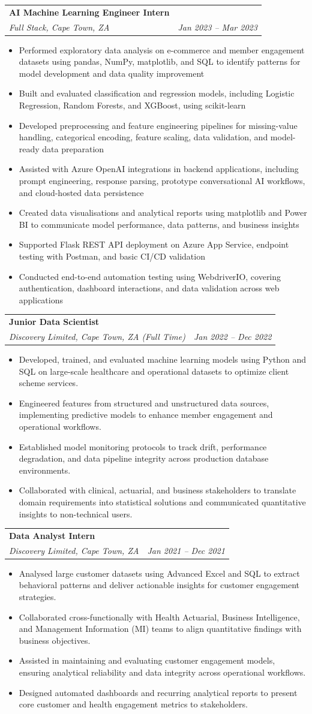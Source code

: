 \documentclass[letterpaper,11pt]{article}
\makeatletter
\newcommand{\resumeItem}[1]{
  \item\small{
    {#1 \vspace{-1pt}}
  }
}
\newcommand{\resumeSubheading}[4]{
  \vspace{-2pt}\item
    \begin{tabular*}{1.0\textwidth}[t]{l@{\extracolsep{\fill}}r}
      \textbf{\large#1} & \textbf{\small #2} \\
      \textit{\large#3} & \textit{\small #4} \\

    \end{tabular*}\vspace{-7pt}
}
\newcommand{\resumeItemListStart}{\begin{itemize}[leftmargin=0.1in]}
\newcommand{\resumeItemListEnd}{\end{itemize}\vspace{-5pt}}
\makeatother
\begin{document}
    \resumeSubheading
      {AI Machine Learning Engineer Intern}{}
      {Full Stack, Cape Town, ZA}{Jan 2023 -- Mar 2023}
      \resumeItemListStart
            \resumeItem{\normalsize{Performed exploratory data analysis on e-commerce and member engagement datasets using pandas, NumPy, matplotlib, and SQL to identify patterns for model development and data quality improvement}}
            \resumeItem{\normalsize{Built and evaluated classification and regression models, including Logistic Regression, Random Forests, and XGBoost, using scikit-learn}}
            \resumeItem{\normalsize{Developed preprocessing and feature engineering pipelines for missing-value handling, categorical encoding, feature scaling, data validation, and model-ready data preparation}}
            \resumeItem{\normalsize{Assisted with Azure OpenAI integrations in backend applications, including prompt engineering, response parsing, prototype conversational AI workflows, and cloud-hosted data persistence}}
            \resumeItem{\normalsize{Created data visualisations and analytical reports using matplotlib and Power BI to communicate model performance, data patterns, and business insights}}
            \resumeItem{\normalsize{Supported Flask REST API deployment on Azure App Service, endpoint testing with Postman, and basic CI/CD validation}}
            \resumeItem{\normalsize{Conducted end-to-end automation testing using WebdriverIO, covering authentication, dashboard interactions, and data validation across web applications}}
      \resumeItemListEnd
      \vspace{7pt}
\resumeSubheading
  {Junior Data Scientist}{}
  {Discovery Limited, Cape Town, ZA (Full Time)}{Jan 2022 -- Dec 2022}
  \resumeItemListStart
    \resumeItem{Developed, trained, and evaluated machine learning models using Python and SQL on large-scale healthcare and operational datasets to optimize client scheme services.}
    \resumeItem{Engineered features from structured and unstructured data sources, implementing predictive models to enhance member engagement and operational workflows.}
    \resumeItem{Established model monitoring protocols to track drift, performance degradation, and data pipeline integrity across production database environments.}
    \resumeItem{Collaborated with clinical, actuarial, and business stakeholders to translate domain requirements into statistical solutions and communicated quantitative insights to non-technical users.}
  \resumeItemListEnd
\resumeSubheading
  {Data Analyst Intern}{}
  {Discovery Limited, Cape Town, ZA}{Jan 2021 -- Dec 2021}
  \resumeItemListStart
    \resumeItem{Analysed large customer datasets using Advanced Excel and SQL to extract behavioral patterns and deliver actionable insights for customer engagement strategies.}
    \resumeItem{Collaborated cross-functionally with Health Actuarial, Business Intelligence, and Management Information (MI) teams to align quantitative findings with business objectives.}
    \resumeItem{Assisted in maintaining and evaluating customer engagement models, ensuring analytical reliability and data integrity across operational workflows.}
    \resumeItem{Designed automated dashboards and recurring analytical reports to present core customer and health engagement metrics to stakeholders.}
  \resumeItemListEnd
\end{document}
